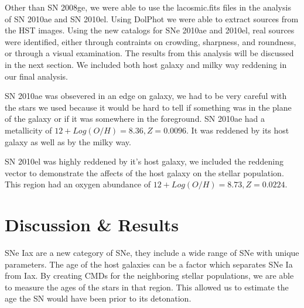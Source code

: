 \documentclass[preprint]{aastex}
\begin{document}
Other than SN 2008ge, we were able to use the lacosmic.fits files in the analysis of SN 2010ae and SN 2010el. 
Using DolPhot we were able to extract sources from the HST images. 
Using the new catalogs for SNe 2010ae and 2010el,
real sources were identified, either through contraints on crowding, sharpness, and roundness,
or through a visual examination. The results from this analysis will be discussed in the next section. 
We included both host galaxy and milky way reddening in our final analysis. 

SN 2010ae was obsevered in an edge on galaxy,
we had to be very careful with the stars we used because it would be hard
to tell if something was in the plane of the galaxy or if it was somewhere in the foreground. 
SN 2010ae had a metallicity of $ 12 + Log(O/H) = 8.36, Z = 0.0096$. It was reddened by its host galaxy
as well as by the milky way. 

SN 2010el was highly reddened by it's host galaxy, we included the reddening vector to demonstrate
the affects of the host galaxy on the stellar population. 
This region had an oxygen abundance of $ 12 + Log(O/H) = 8.73, Z = 0.0224.$





\section{Discussion \& Results}


SNe Iax are a new category of SNe, they include a wide range of SNe with unique parameters.
The age of the host galaxies can be a factor which separates 
SNe Ia from Iax.
By creating CMDs for the neighboring stellar populations,
we are able to measure the ages of the stars in that region. 
This allowed us to estimate the age the SN would have been prior to its detonation. 
\end{document}
